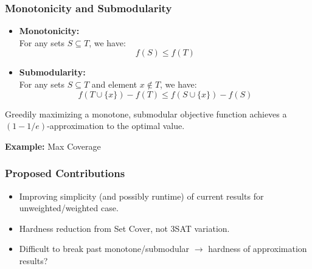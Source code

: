 \documentclass{beamer}
\begin{document}
\begin{frame}
  \frametitle{Monotonicity and Submodularity}

  \begin{itemize}
    \item \textbf{Monotonicity:} \\
      For any sets $S \subseteq T$, we have:
      \[
        f(S) \leq f(T)
      \]
    \pause
    \item \textbf{Submodularity:} \\
      For any sets $S \subseteq T$ and element $x \notin T$, we have:
      \[
        f(T \cup \{x\}) - f(T) \leq f(S \cup \{x\}) - f(S)
      \]
  \end{itemize}\pause

  \vspace{0.5em}

  \begin{theorem}
    Greedily maximizing a monotone, submodular objective function achieves a $(1 - 1/e)$-approximation to the optimal value.
  \end{theorem}\pause

  \vspace{0.5em}

  \textbf{Example:} Max Coverage
\end{frame}



\begin{frame}
    \frametitle{Proposed Contributions}
    \begin{itemize}
      \item Improving simplicity (and possibly runtime) of current results for unweighted/weighted case.\pause
      \item Hardness reduction from Set Cover, not 3SAT variation.\pause
      \item Difficult to break past monotone/submodular $\rightarrow$ hardness of approximation results?
    \end{itemize}
\end{frame}
\end{document}
